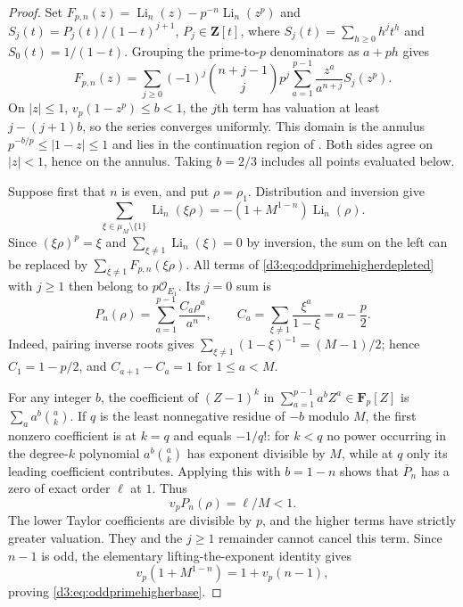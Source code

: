 \documentclass[11pt,a4paper]{amsart}
\numberwithin{equation}{section}
\theoremstyle{definition}
\theoremstyle{remark}
\newcommand{\Z}{\mathbf Z}
\newcommand{\F}{\mathbf F}
\begin{document}
\begin{proof}
Set $F_{p,n}(z)=\operatorname{Li}_n(z)-p^{-n}
\operatorname{Li}_n(z^p)$ and
$S_j(t)=P_j(t)/(1-t)^{j+1}$, $P_j\in\Z[t]$, where
$S_j(t)=\sum_{h\geq0}h^jt^h$ and $S_0(t)=1/(1-t)$.
Grouping the prime-to-$p$ denominators as $a+ph$ gives
\begin{equation}\label{d3:eq:oddprimehigherdepleted}
 F_{p,n}(z)=\sum_{j\geq0}(-1)^j\binom{n+j-1}{j}p^j
       \sum_{a=1}^{p-1}\frac{z^a}{a^{n+j}}S_j(z^p).
\end{equation}
On $|z|\leq1$, $v_p(1-z^p)\leq b<1$, the $j$th term has
valuation at least $j-(j+1)b$, so the series converges uniformly.
This domain is the annulus
$p^{-b/p}\leq|1-z|\leq1$ and lies in the continuation region
of \cite[Theorem~2.7(3)]{BesserDeJeuAlgorithm}.
Both sides agree on $|z|<1$, hence on the annulus. Taking
$b=2/3$ includes all points evaluated below.

Suppose first that $n$ is even, and put $\rho=\rho_1$.
Distribution and inversion
\cite[Proposition~2.10]{BesserDeJeuAlgorithm} give
\[
 \sum_{\xi\in\mu_M\setminus\{1\}}\operatorname{Li}_n(\xi\rho)
       =-(1+M^{1-n})\operatorname{Li}_n(\rho).
\]
Since $(\xi\rho)^p=\xi$ and
$\sum_{\xi\ne1}\operatorname{Li}_n(\xi)=0$ by inversion,
the sum on the left can be replaced by
$\sum_{\xi\ne1}F_{p,n}(\xi\rho)$.
All terms of \eqref{d3:eq:oddprimehigherdepleted} with $j\geq1$
then belong to $p\mathcal O_{E_1}$. Its $j=0$ sum is
\[
 P_n(\rho)=\sum_{a=1}^{p-1}\frac{C_a\rho^a}{a^n},\qquad
 C_a=\sum_{\xi\ne1}\frac{\xi^a}{1-\xi}=a-\frac p2.
\]
Indeed, pairing inverse roots gives
$\sum_{\xi\ne1}(1-\xi)^{-1}=(M-1)/2$; hence
$C_1=1-p/2$, and $C_{a+1}-C_a=1$ for $1\leq a<M$.

For any integer $b$, the coefficient of $(Z-1)^k$ in
$\sum_{a=1}^{p-1}a^bZ^a\in\F_p[Z]$ is
$\sum_a a^b\binom ak$.
If $q$ is the least nonnegative residue of $-b$ modulo $M$,
the first nonzero coefficient is at $k=q$ and equals $-1/q!$:
for $k<q$ no power occurring in the degree-$k$ polynomial
$a^b\binom ak$ has exponent divisible by $M$, while at $q$
only its leading coefficient contributes.
Applying this with $b=1-n$ shows that $\overline P_n$
has a zero of exact order $\ell$ at $1$. Thus
\[
 v_pP_n(\rho)=\ell/M<1.
\]
The lower Taylor coefficients are divisible by $p$, and the
higher terms have strictly greater valuation. They and the
$j\geq1$ remainder cannot cancel this term.
Since $n-1$ is odd, the elementary lifting-the-exponent identity gives
\[
 v_p(1+M^{1-n})=1+v_p(n-1),
\]
proving \eqref{d3:eq:oddprimehigherbase}.


\end{proof}
\end{document}
